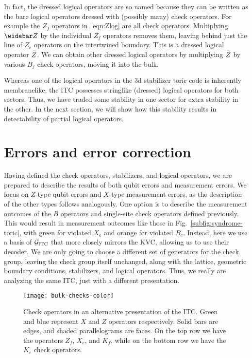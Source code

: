 In fact, the dressed logical operators are so named because they can be written as the bare logical operators dressed with (possibly many) check operators. For example the $Z_f$ operators in~\ref{eqn:Zlog} are all check operators. Multiplying $\barelogical{Z}$ by the individual $Z_f$ operators removes them, leaving behind just the line of $Z_e$ operators on the intertwined boundary. This is a dressed logical operator $\widetilde{Z}$. We can obtain other dressed logical operators by multiplying $\widetilde{Z}$ by various $B_f$ check operators, moving it into the bulk.

Whereas one of the logical operators in the 3d stabilizer toric code is inherently membranelike, the ITC possesses stringlike (dressed) logical operators for both sectors. Thus, we have traded some stability in one sector for extra stability in the other. In the next section, we will show how this stability results in detectability of partial logical operators.

\section{Errors and error correction} \label{sec:errors}

Having defined the check operators, stabilizers, and logical operators, we are prepared to describe the results of both qubit errors and measurement errors. We focus on $Z$-type qubit errors and $X$-type measurement errors, as the description of the other types follows analogously. One option is to describe the measurement outcomes of the $B$ operators and single-site check operators defined previously. This would result in measurement outcomes like those in Fig.~\ref{subfig:syndrome-toric}, with green for violated $X_e$ and orange for violated $B_e$. Instead, here we use a basis of $\mathcal{G}_{\text{ITC}}$ that more closely mirrors the KVC, allowing us to use their decoder. We are only going to choose a different set of generators for the check group, leaving the check group itself unchanged, along with the lattice, geometric boundary conditions, stabilizers, and logical operators. Thus, we really are analyzing the same ITC, just with a different presentation. 

\begin{figure}[th!]
    \centering
    \texttt{[image: bulk-checks-color]}
    \caption[Check operators in an alternative presentation of the ITC]{Check operators in an alternative presentation of the ITC. Green and blue represent $X$ and $Z$ operators respectively. Solid bars are edges, and shaded parallelograms are faces. On the top row we have the operators $Z_f$, $X_e$, and $K_f$, while on the bottom row we have the $K_e$ check operators.}
    \label{fig:checks}
\end{figure}

